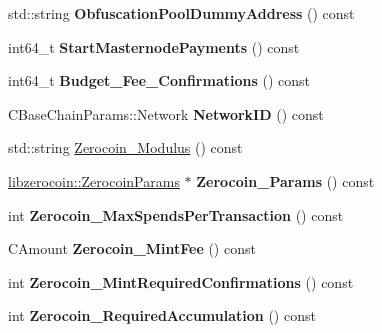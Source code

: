 \begin{DoxyCompactItemize}
\item 
\mbox{\label{class_c_chain_params_acf6464af63708a37e52876d2792eb27e}} 
std\+::string {\bfseries Obfuscation\+Pool\+Dummy\+Address} () const
\item 
\mbox{\label{class_c_chain_params_af732a05c80cf79a71b0f6bc5ce113c98}} 
int64\+\_\+t {\bfseries Start\+Masternode\+Payments} () const
\item 
\mbox{\label{class_c_chain_params_affd375d849ab3faefea3301b9ecbdf6b}} 
int64\+\_\+t {\bfseries Budget\+\_\+\+Fee\+\_\+\+Confirmations} () const
\item 
\mbox{\label{class_c_chain_params_a3af50135596ad86019f274c8a15e580f}} 
C\+Base\+Chain\+Params\+::\+Network {\bfseries Network\+ID} () const
\item 
std\+::string \mbox{\hyperlink{class_c_chain_params_af6003afc48876c16e825f589eed0ff11}{Zerocoin\+\_\+\+Modulus}} () const
\item 
\mbox{\label{class_c_chain_params_a630db503e18106a7b797cdfe0a184437}} 
\mbox{\hyperlink{classlibzerocoin_1_1_zerocoin_params}{libzerocoin\+::\+Zerocoin\+Params}} $\ast$ {\bfseries Zerocoin\+\_\+\+Params} () const
\item 
\mbox{\label{class_c_chain_params_a9c9564cce9a2852ec277560c03c7bf5f}} 
int {\bfseries Zerocoin\+\_\+\+Max\+Spends\+Per\+Transaction} () const
\item 
\mbox{\label{class_c_chain_params_a68324f698999844cf8bdb511ab5bf89a}} 
C\+Amount {\bfseries Zerocoin\+\_\+\+Mint\+Fee} () const
\item 
\mbox{\label{class_c_chain_params_a76f3eaab883c0359e8c0b2d6941ef39c}} 
int {\bfseries Zerocoin\+\_\+\+Mint\+Required\+Confirmations} () const
\item 
\mbox{\label{class_c_chain_params_ae0c16d94f2017bc9fe0ab558447b61ed}} 
int {\bfseries Zerocoin\+\_\+\+Required\+Accumulation} () const
\item 
\mbox{\label{class_c_chain_params_aae50ef1ebe703e91b9bef340e7557f24}} 

\end{DoxyCompactItemize}
